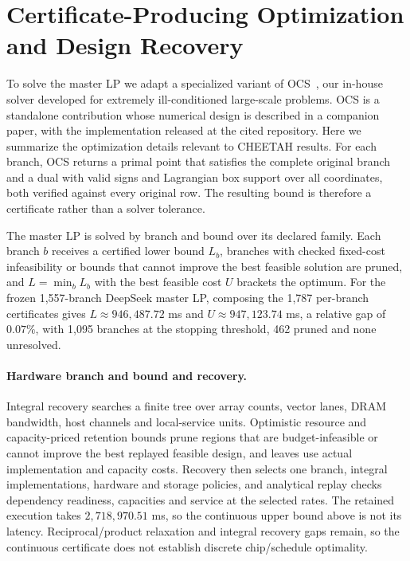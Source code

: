 \section{Certificate-Producing Optimization and Design Recovery}
\label{sec:solver_vm}\label{sec:ocs}\label{sec:vm_solver}\label{sec:mccormick_blowup}
To solve the master LP we adapt a specialized variant of OCS~\citep{feng2026ocs}, our in-house solver developed for extremely ill-conditioned large-scale problems.
OCS is a standalone contribution whose numerical design is described in a companion paper, with the implementation released at the cited repository.
Here we summarize the optimization details relevant to CHEETAH results.
For each branch, OCS returns a primal point that satisfies the complete original branch and a dual with valid signs and Lagrangian box support over all coordinates, both verified against every original row.
The resulting bound is therefore a certificate rather than a solver tolerance.

The master LP is solved by branch and bound over its declared family.
Each branch $b$ receives a certified lower bound $L_b$, branches with checked fixed-cost infeasibility or bounds that cannot improve the best feasible solution are pruned, and $L=\min_bL_b$ with the best feasible cost $U$ brackets the optimum.
For the frozen 1,557-branch DeepSeek master LP, composing the 1,787 per-branch certificates gives $L\approx946{,}487.72$ ms and $U\approx947{,}123.74$ ms, a relative gap of $0.07\%$, with 1,095 branches at the stopping threshold, 462 pruned and none unresolved.

\paragraph{Hardware branch and bound and recovery.}
Integral recovery searches a finite tree over array counts, vector lanes, DRAM bandwidth, host channels and local-service units.
Optimistic resource and capacity-priced retention bounds prune regions that are budget-infeasible or cannot improve the best replayed feasible design, and leaves use actual implementation and capacity costs.
Recovery then selects one branch, integral implementations, hardware and storage policies, and analytical replay checks dependency readiness, capacities and service at the selected rates.
The retained execution takes $2{,}718{,}970.51$ ms, so the continuous upper bound above is not its latency.
Reciprocal/product relaxation and integral recovery gaps remain, so the continuous certificate does not establish discrete chip/schedule optimality.
